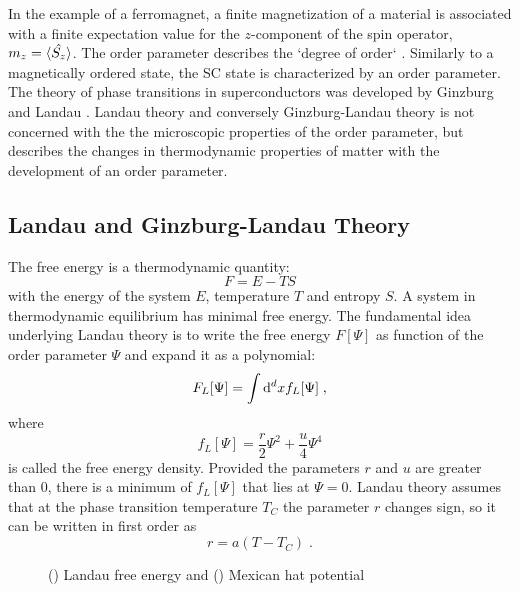 \documentclass[../notes.tex]{subfiles}
\begin{document}
In the example of a ferromagnet, a finite magnetization of a material is associated with a finite expectation value for the \(z\)-component of the spin operator, \(m_z = \braket{\hat{S_z}}\).
The order parameter describes the `degree of order` \cite{landauTheoryPhaseTransitions1937}.
Similarly to a magnetically ordered state, the SC state is characterized by an order parameter.
The theory of phase transitions in superconductors was developed by Ginzburg and Landau \cite{ginzburgTheorySuperconductivity1950}.
Landau theory and conversely Ginzburg-Landau theory is not concerned with the the microscopic properties of the order parameter, but describes the changes in thermodynamic properties of matter with the development of an order parameter.

\subsection*{Landau and Ginzburg-Landau Theory}\label{sub:Landau and Ginzburg-Landau Theory}

The free energy is a thermodynamic quantity:
\begin{equation}
	F = E - T S
\end{equation}
with the energy of the system \(E\), temperature \(T\) and entropy \(S\).
A system in thermodynamic equilibrium has minimal free energy.
The fundamental idea underlying Landau theory is to write the free energy \(F[\Psi]\) as function of the order parameter \(\Psi\) and expand it as a polynomial:
\begin{equation}
	F_L[\Psi] = \int \odif[order={d}]{x} f_L [\Psi] \;,
\end{equation}
where
\begin{equation}
	f_L [\Psi] = \frac{r}{2} \Psi^2 + \frac{u}{4} \Psi^4
\end{equation}
is called the free energy density.
Provided the parameters \(r\) and \(u\) are greater than \(0\), there is a minimum of \(f_L [\Psi]\) that lies at \(\Psi = 0\).
Landau theory assumes that at the phase transition temperature \(T_C\) the parameter \(r\) changes sign, so it can be written in first order as
\begin{equation}
	r = a(T - T_C) \;.
\end{equation}

\begin{figure}[t]
	\centering
	\begin{subfigure}[b]{0.5\textwidth}
		\centering
		\caption{\hfill\null}\label{sfig:Landau free energy}
		
	\end{subfigure}%
	\begin{subfigure}[b]{0.5\textwidth}
		\centering
		\caption{\hfill\null}\label{sfig:Ginzburg Landau free energy}
		
	\end{subfigure}
	\caption{() Landau free energy and () Mexican hat potential} 
	\label{fig:Landau free energy and Ginzburg-Landau free energy}
\end{figure}
\end{document}

